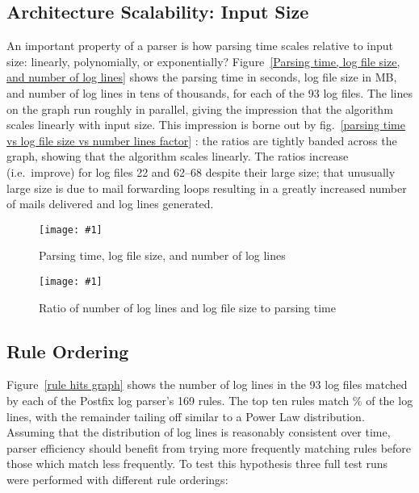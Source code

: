 \documentclass[preprint,draft,numbers]{elsarticle}
\newcommand{\showgraph}[3]{%
    \begin{figure}[btp]%
        \texttt{[image: \#1]}%
        \caption{#2}\label{#3}%
    \end{figure}%
}
\newcommand{\refwithlabel}[2]{%
    #1~\vref{#2}%
}
\newcommand{\graphref}[1]{%
    \refwithlabel{fig.}{#1}%
}
\newcommand{\Graphref}[1]{%
    \refwithlabel{Figure}{#1}%
}
\newcommand{\numberOFlogFILES}[0]{%
    93%
}
\newcommand{\numberOFrules}[0]{%
    169%
}
\begin{document}
\subsection{Architecture Scalability: Input Size}

An important property of a parser is how parsing time scales relative to
input size: linearly, polynomially, or exponentially?  \Graphref{Parsing
time, log file size, and number of log lines} shows the parsing time in
seconds, log file size in MB, and number of log lines in tens of thousands,
for each of the \numberOFlogFILES{} log files.  The lines on the graph run
roughly in parallel, giving the impression that the algorithm scales
linearly with input size.  This impression is borne out by
\graphref{parsing time vs log file size vs number lines factor}: the ratios
are tightly banded across the graph, showing that the algorithm scales
linearly.  The ratios increase (i.e.\ improve) for log files 22 and 62--68
despite their large size; that unusually large size is due to mail
forwarding loops resulting in a greatly increased number of mails delivered
and log lines generated.

\showgraph{build/graph-input-size-vs-parsing-time}{Parsing time, log file size,
and number of log lines}{Parsing time, log file size, and number of log lines}
\showgraph{build/graph-input-size-vs-parsing-time-ratio}{Ratio of number of
log lines and log file size to parsing time}{parsing time vs log file size vs
number lines factor}

\subsection{Rule Ordering}

\label{Rule ordering}

\Graphref{rule hits graph} shows the number of log lines in the
\numberOFlogFILES{} log files matched by each of the Postfix log parser's
\numberOFrules{} rules.  The top ten rules match
\% of the log lines, with the remainder
tailing off similar to a Power Law distribution.  Assuming that the
distribution of log lines is reasonably consistent over time, parser
efficiency should benefit from trying more frequently matching rules before
those which match less frequently.  To test this hypothesis three full test
runs were performed with different rule orderings:
\end{document}
